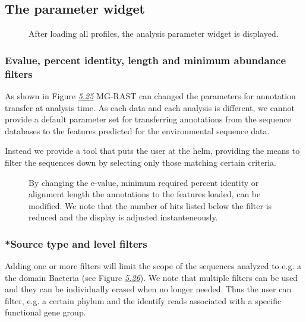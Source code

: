 \documentclass[letterpaper,10pt,english]{sphinxmanual}
\begin{document}
\subsection{The parameter widget}
\label{\detokenize{user_manual:the-parameter-widget}}
\begin{figure}[htbp]
\centering
\capstart

\noindent{}
\caption{After loading all profiles, the analysis parameter widget is
displayed.}\label{\detokenize{user_manual:fig-v4-analysis-page-parameters-initial}}\end{figure}


\subsubsection{Evalue, percent identity, length and minimum abundance filters}
\label{\detokenize{user_manual:evalue-percent-identity-length-and-minimum-abundance-filters}}
As shown in Figure {\hyperref[\detokenize{user_manual:fig:v4-analysis-page-evalue-filter}]{\emph{5.25}}}
MG-RAST can changed the parameters for annotation transfer at analysis
time. As each data and each analysis is different, we cannot provide a
default parameter set for transferring annotations from the sequence
databases to the features predicted for the environmental sequence data.

Instead we provide a tool that puts the user at the helm, providing the
means to filter the sequences down by selecting only those matching
certain criteria.

\begin{figure}[htbp]
\centering
\capstart

\noindent{}
\caption{By changing the e-value, minimum required percent identity or
alignment length the annotations to the features loaded, can be
modified. We note that the number of hits listed below the filter is
reduced and the display is adjusted instanteneously.}\label{\detokenize{user_manual:fig-v4-analysis-page-evalue-filter}}\end{figure}


\subsubsection{*Source type and level filters}
\label{\detokenize{user_manual:source-type-and-level-filters}}
Adding one or more filters will limit the scope of the sequences
analyzed to e.g. a the domain Bacteria (see Figure
{\hyperref[\detokenize{user_manual:fig:v4-analysis-page-domain-filter}]{\emph{5.26}}}). We note that multiple
filters can be used and they can be individually erased when no longer
needed. Thus the user can filter, e.g. a certain phylum and the identify
reads associated with a specific functional gene group.
\end{document}
